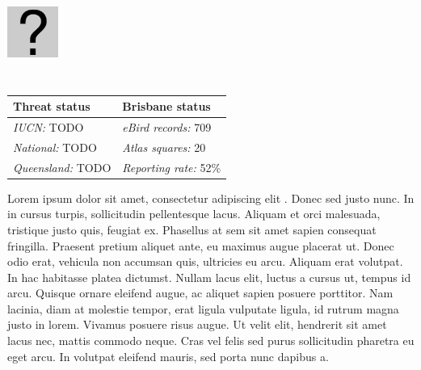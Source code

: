 \documentclass[12pt,openany,oneside]{book}
\let\origfigure\figure
\let\endorigfigure\endfigure
\renewenvironment{figure}[1][2] {
  \expandafter\origfigure\expandafter[H]
} {
  \endorigfigure
}
\theoremstyle{definition}
\theoremstyle{definition}
\theoremstyle{definition}
\theoremstyle{remark}
\begin{document}
\begin{figure}
\centering
\includegraphics[width=63px,height=120px]{assets/profile/missing.png}
\caption{Insert caption here.}
\end{figure}

\begin{tabu} to 
\toprule
Threat status & Brisbane status\\
\midrule
\textit{IUCN:} TODO & \textit{eBird records:} 709\\
\textit{National:} TODO & \textit{Atlas squares:} 20\\
\textit{Queensland:} TODO & \textit{Reporting rate:} 52\%\\
\bottomrule
\end{tabu}

Lorem ipsum dolor sit amet, consectetur adipiscing elit
\citep{rexample1, rexample2, rexample3}. Donec sed justo nunc. In in
cursus turpis, sollicitudin pellentesque lacus. Aliquam et orci
malesuada, tristique justo quis, feugiat ex. Phasellus at sem sit amet
sapien consequat fringilla. Praesent pretium aliquet ante, eu maximus
augue placerat ut. Donec odio erat, vehicula non accumsan quis,
ultricies eu arcu. Aliquam erat volutpat. In hac habitasse platea
dictumst. Nullam lacus elit, luctus a cursus ut, tempus id arcu. Quisque
ornare eleifend augue, ac aliquet sapien posuere porttitor. Nam lacinia,
diam at molestie tempor, erat ligula vulputate ligula, id rutrum magna
justo in lorem. Vivamus posuere risus augue. Ut velit elit, hendrerit
sit amet lacus nec, mattis commodo neque. Cras vel felis sed purus
sollicitudin pharetra eu eget arcu. In volutpat eleifend mauris, sed
porta nunc dapibus a.
\end{document}

